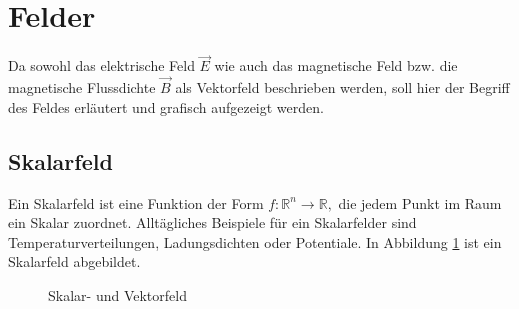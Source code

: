 %
%
% 
%
%
\section{Felder\label{maxwell:mathFormulierung}}

Da sowohl das elektrische Feld $\vec{E}$ wie auch das magnetische Feld bzw. die magnetische Flussdichte $\vec{B}$ als Vektorfeld beschrieben werden, soll hier der Begriff des Feldes erläutert und grafisch aufgezeigt werden.

\subsection{Skalarfeld\label{maxwell:skalarfeld}}

Ein Skalarfeld ist eine Funktion der Form
\( f:\mathbb{R}^n \rightarrow \mathbb{R}, \) 
die jedem Punkt im Raum ein Skalar zuordnet.
Alltägliches Beispiele für ein Skalarfelder sind Temperaturverteilungen, Ladungsdichten oder Potentiale. In Abbildung \ref{maxwell:skalarGrad} ist ein Skalarfeld abgebildet.



\begin{figure}
	\centering
	\caption{Skalar- und Vektorfeld}
	\label{maxwell:skalarGrad}
\end{figure}

